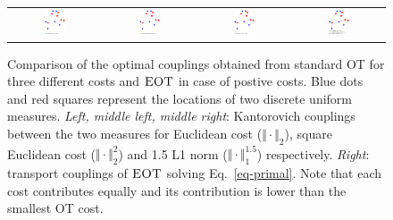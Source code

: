 \begin{figure}[h!]
\begin{tabular}{@{}c@{}c@{}c@{}c@{}}
\includegraphics[width=0.25\textwidth]{sections/appendix/aistats2021_eot/figures/primal_W_1_norm.pdf}&
\includegraphics[width=0.25\textwidth]{sections/appendix/aistats2021_eot/figures/primal_W_2_norm.pdf}&
\includegraphics[width=0.25\textwidth]{sections/appendix/aistats2021_eot/figures/primal_W_3_norm.pdf}&
\includegraphics[width=0.25\textwidth]{sections/appendix/aistats2021_eot/figures/primal_W_1_2_3_norm.pdf}
\end{tabular}
\caption{Comparison of the optimal couplings obtained from standard OT for three different costs and $\textsc{EOT}$ in case of postive costs. Blue dots and red squares represent the locations of two discrete uniform measures. \emph{Left, middle left, middle right}: Kantorovich couplings between the two measures for Euclidean cost  ($\Vert\cdot\Vert_2$), square Euclidean cost ($\Vert\cdot\Vert_2^{2}$) and 1.5 L1 norm ($\Vert\cdot\Vert_1^{1.5}$) respectively. \emph{Right}: transport couplings of $\textsc{EOT}$ solving Eq.~\eqref{eq-primal}. Note that each cost contributes equally and its contribution is lower than the smallest OT cost.}
\label{fig:transport-map-ot-view}
\end{figure}


